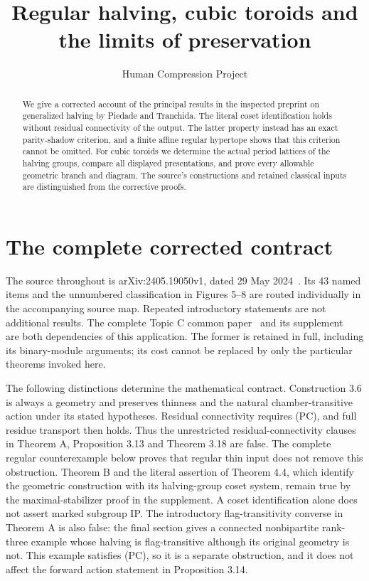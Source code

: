 
\title{Regular halving, cubic toroids and the limits of preservation}
\author{Human Compression Project}\date{}
\maketitle
\begin{abstract}
We give a corrected account of the principal results in the inspected
preprint on generalized halving by Piedade and Tranchida. The literal
coset identification holds without residual connectivity of the output.
The latter property instead has an exact parity-shadow criterion, and a
finite affine regular hypertope shows that this criterion cannot be
omitted. For cubic toroids we determine the actual period lattices of
the halving groups, compare all displayed presentations, and prove every
allowable geometric branch and diagram. The source's constructions and
retained classical inputs are distinguished from the corrective proofs.
\end{abstract}

\section{The complete corrected contract}\label{A.contract}
The source throughout is arXiv:2405.19050v1, dated 29 May 2024~\cite{PT}.
Its 43 named items and the unnumbered classification in Figures 5--8
are routed individually in the accompanying source map. Repeated
introductory statements are not additional results. The complete
Topic C common paper~\cite{OldCommon} and its supplement~\cite{Common}
are both dependencies of this application. The former is retained
in full, including its binary-module arguments; its cost cannot be
replaced by only the particular theorems invoked here.

The following distinctions determine the mathematical contract.
Construction 3.6 is always a geometry and preserves thinness and the
natural chamber-transitive action under its stated hypotheses.
Residual connectivity requires (PC), and full residue transport then
holds. Thus the unrestricted residual-connectivity clauses in Theorem A,
Proposition 3.13 and Theorem 3.18 are false. The complete regular
counterexample below proves that regular thin input does not remove
this obstruction. Theorem B and the literal assertion of Theorem 4.4,
which identify the geometric construction with its halving-group coset
system, remain true by the maximal-stabilizer proof in the supplement.
A coset identification alone does not assert marked subgroup IP.
The introductory flag-transitivity converse in Theorem A is also false:
the final section gives a connected nonbipartite rank-three example whose
halving is flag-transitive although its original geometry is not. This
example satisfies (PC), so it is a separate obstruction, and it does not
affect the forward action statement in Proposition 3.14.

